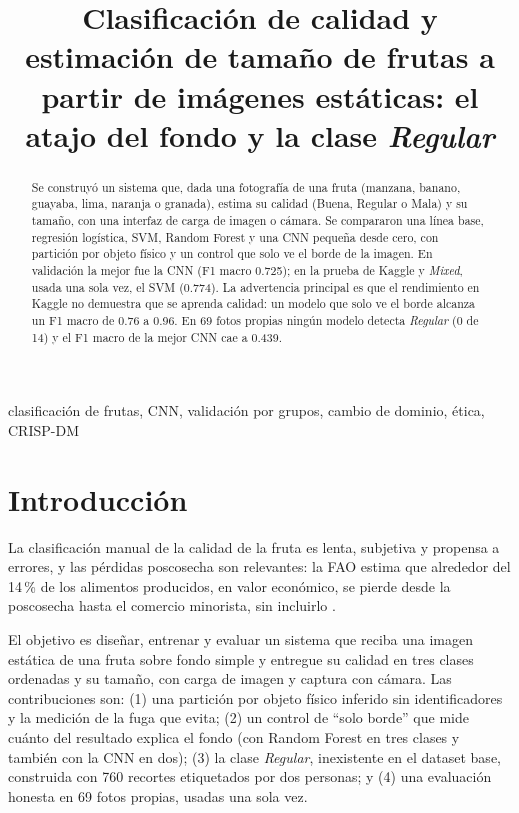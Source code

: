 \documentclass[conference]{IEEEtran}
\begin{document}
\title{Clasificaci\'on de calidad y estimaci\'on de tama\~no de frutas a partir de im\'agenes est\'aticas: el atajo del fondo y la clase \emph{Regular}}

\author{
}

\maketitle

\begin{abstract}
Se construy\'o un sistema que, dada una fotograf\'ia de una fruta (manzana, banano, guayaba, lima, naranja o granada), estima su calidad (Buena, Regular o Mala) y su tama\~no, con una interfaz de carga de imagen o c\'amara. Se compararon una l\'inea base, regresi\'on log\'istica, SVM, Random Forest y una CNN peque\~na desde cero, con partici\'on por objeto f\'isico y un control que solo ve el borde de la imagen. En validaci\'on la mejor fue la CNN (F1 macro 0.725); en la prueba de Kaggle y \emph{Mixed}, usada una sola vez, el SVM (0.774). La advertencia principal es que el rendimiento en Kaggle no demuestra que se aprenda calidad: un modelo que solo ve el borde alcanza un F1 macro de 0.76 a 0.96. En 69 fotos propias ning\'un modelo detecta \emph{Regular} (0 de 14) y el F1 macro de la mejor CNN cae a 0.439.
\end{abstract}

\begin{IEEEkeywords}
clasificaci\'on de frutas, CNN, validaci\'on por grupos, cambio de dominio, \'etica, CRISP-DM
\end{IEEEkeywords}

\section{Introducci\'on}
La clasificaci\'on manual de la calidad de la fruta es lenta, subjetiva y propensa a errores, y las p\'erdidas poscosecha son relevantes: la FAO estima que alrededor del 14\,\% de los alimentos producidos, en valor econ\'omico, se pierde desde la poscosecha hasta el comercio minorista, sin incluirlo \cite{fao2019sofa}.

El objetivo es dise\~nar, entrenar y evaluar un sistema que reciba una imagen est\'atica de una fruta sobre fondo simple y entregue su calidad en tres clases ordenadas y su tama\~no, con carga de imagen y captura con c\'amara. Las contribuciones son: (1) una partici\'on por objeto f\'isico inferido sin identificadores y la medici\'on de la fuga que evita; (2) un control de ``solo borde'' que mide cu\'anto del resultado explica el fondo (con Random Forest en tres clases y tambi\'en con la CNN en dos); (3) la clase \emph{Regular}, inexistente en el dataset base, construida con 760 recortes etiquetados por dos personas; y (4) una evaluaci\'on honesta en 69 fotos propias, usadas una sola vez.
\end{document}
